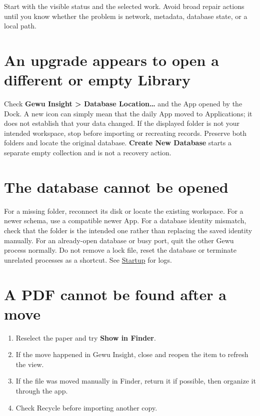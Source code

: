 \documentclass[10pt,letterpaper,oneside]{scrreprt}
\providecommand{\tightlist}{\setlength{\itemsep}{1pt}\setlength{\parskip}{0pt}}
\newenvironment{GewuLead}
  {\begin{list}{}{\leftmargin=0pt\rightmargin=0pt\topsep=0pt\partopsep=0pt\parsep=0pt}\item\relax
    \sffamily\fontsize{10.5}{13.2}\selectfont\color{GewuMuted}}
  {\end{list}}
\begin{document}
\begin{GewuLead}
Start with the visible status and the selected work. Avoid broad repair actions until you know whether the problem is network, metadata, database state, or a local path.
\end{GewuLead}

\section{An upgrade appears to open a different or empty Library}\label{an-upgrade-appears-to-open-a-different-or-empty-library}

Check \textbf{Gewu Insight \textgreater{} Database Location\ldots{}} and the App opened by the Dock. A new icon can simply mean that the daily App moved to Applications; it does not establish that your data changed. If the displayed folder is not your intended workspace, stop before importing or recreating records. Preserve both folders and locate the original database. \textbf{Create New Database} starts a separate empty collection and is not a recovery action.

\section{The database cannot be opened}\label{the-database-cannot-be-opened}

For a missing folder, reconnect its disk or locate the existing workspace. For a newer schema, use a compatible newer App. For a database identity mismatch, check that the folder is the intended one rather than replacing the saved identity manually. For an already-open database or busy port, quit the other Gewu process normally. Do not remove a lock file, reset the database or terminate unrelated processes as a shortcut. See \hyperref[startup]{Startup} for logs.

\section{A PDF cannot be found after a move}\label{a-pdf-cannot-be-found-after-a-move}

\begin{enumerate}
\tightlist
\item
  Reselect the paper and try \textbf{Show in Finder}.
\item
  If the move happened in Gewu Insight, close and reopen the item to refresh the view.
\item
  If the file was moved manually in Finder, return it if possible, then organize it through the app.
\item
  Check Recycle before importing another copy.
\end{enumerate}
\end{document}
